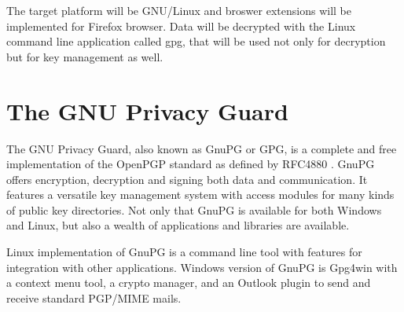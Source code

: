 The target platform will be GNU/Linux and broswer extensions will be implemented for Firefox browser. Data will be decrypted with the Linux command line application called gpg, that will be used not only for decryption but for key management as well.


\chapter{The GNU Privacy Guard}
The GNU Privacy Guard, also known as GnuPG or GPG, is a complete and free implementation of the OpenPGP standard as defined by RFC4880 \cite{RFC4880}. GnuPG offers encryption, decryption and signing both data and communication. It features a versatile key management system with access modules for many kinds of public key directories. Not only that GnuPG is available for both Windows and Linux, but also a wealth of applications and libraries are available. \cite{GnuPG}

Linux implementation of GnuPG is a command line tool with features for integration with other applications. Windows version of GnuPG is Gpg4win with a context menu tool, a crypto manager, and an Outlook plugin to send and receive standard PGP/MIME mails. \cite{GnuPG}

